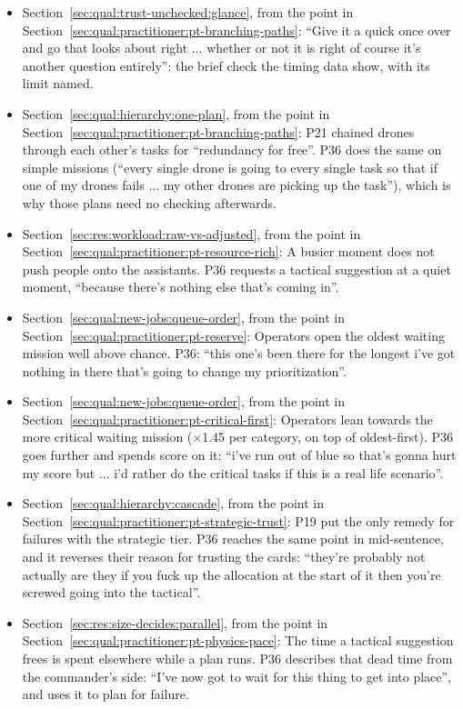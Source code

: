 \begin{itemize}[leftmargin=1.2em,itemsep=1pt]
\item Section~\ref{sec:qual:trust-unchecked:glance}, from the point in Section~\ref{sec:qual:practitioner:pt-branching-paths}: ``Give it a quick once over and go that looks about right ... whether or not it is right of course it's another question entirely'': the brief check the timing data show, with its limit named.
\item Section~\ref{sec:qual:hierarchy:one-plan}, from the point in Section~\ref{sec:qual:practitioner:pt-branching-paths}: P21 chained drones through each other's tasks for ``redundancy for free''. P36 does the same on simple missions (``every single drone is going to every single task so that if one of my drones fails ... my other drones are picking up the task''), which is why those plans need no checking afterwards.
\item Section~\ref{sec:res:workload:raw-vs-adjusted}, from the point in Section~\ref{sec:qual:practitioner:pt-resource-rich}: A busier moment does not push people onto the assistants. P36 requests a tactical suggestion at a quiet moment, ``because there's nothing else that's coming in''.
\item Section~\ref{sec:qual:new-jobs:queue-order}, from the point in Section~\ref{sec:qual:practitioner:pt-reserve}: Operators open the oldest waiting mission well above chance. P36: ``this one's been there for the longest i've got nothing in there that's going to change my prioritization''.
\item Section~\ref{sec:qual:new-jobs:queue-order}, from the point in Section~\ref{sec:qual:practitioner:pt-critical-first}: Operators lean towards the more critical waiting mission ($\times$1.45 per category, on top of oldest-first). P36 goes further and spends score on it: ``i've run out of blue so that's gonna hurt my score but ... i'd rather do the critical tasks if this is a real life scenario''.
\item Section~\ref{sec:qual:hierarchy:cascade}, from the point in Section~\ref{sec:qual:practitioner:pt-strategic-trust}: P19 put the only remedy for failures with the strategic tier. P36 reaches the same point in mid-sentence, and it reverses their reason for trusting the cards: ``they're probably not actually are they if you fuck up the allocation at the start of it then you're screwed going into the tactical''.
\item Section~\ref{sec:res:size-decides:parallel}, from the point in Section~\ref{sec:qual:practitioner:pt-physics-pace}: The time a tactical suggestion frees is spent elsewhere while a plan runs. P36 describes that dead time from the commander's side: ``I've now got to wait for this thing to get into place'', and uses it to plan for failure.

\end{itemize}

